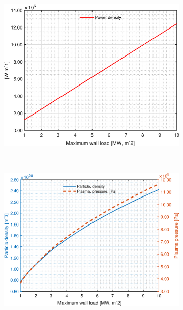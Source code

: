 \begin{figure}[H]
	\begin{subfigure}[b]{.45\textwidth}
		\includegraphics[width=\textwidth]{MatlabFigures/PW/f5.eps}
	\end{subfigure}
	~
	\begin{subfigure}[b]{.45\textwidth}
		\includegraphics[width=\textwidth]{MatlabFigures/PW/f6.eps}
	\end{subfigure}


\end{figure}
